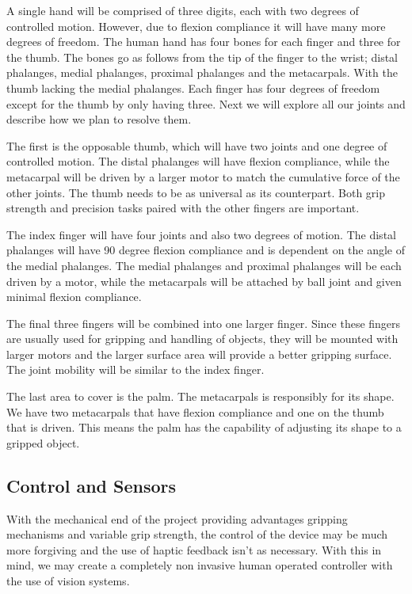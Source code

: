 \documentclass{article}
\begin{document}
A single hand will be comprised of three digits, each with two degrees of controlled motion. However, due to flexion compliance it will have many more degrees of freedom. The human hand has four bones for each finger and three for the thumb. The bones go as follows from the tip of the finger to the wrist; distal phalanges, medial phalanges, proximal phalanges and the metacarpals. With the thumb lacking the medial phalanges. Each finger has four degrees of freedom except for the thumb by only having three. Next we will explore all our joints and describe how we plan to resolve them. 

The first is the opposable thumb, which will have two joints and one degree of controlled motion. The distal phalanges will have flexion compliance, while the metacarpal will be driven by a larger motor to match the cumulative force of the other joints. The thumb needs to be as universal as its counterpart. Both grip strength and precision tasks paired with the other fingers are important. 

The index finger will have four joints and also two degrees of motion. The distal phalanges will have 90 degree flexion compliance and is dependent on the angle of the medial phalanges. The medial phalanges and proximal phalanges will be each driven by a motor, while the metacarpals will be attached by ball joint and given minimal flexion compliance.

The final three fingers will be combined into one larger finger. Since these fingers are usually used for gripping and handling of objects, they will be mounted with larger motors and the larger surface area will provide a better gripping surface. The joint mobility will be similar to the index finger.

The last area to cover is the palm. The metacarpals is responsibly for its shape. We have two metacarpals that have flexion compliance and one on the thumb that is driven. This means the palm has the capability of adjusting its shape to a gripped object.

\subsection{Control and Sensors}

With the mechanical end of the project providing advantages gripping mechanisms and variable grip strength, the control of the device may be much more forgiving and the use of haptic feedback isn't as necessary. With this in mind, we may create a completely non invasive human operated controller with the use of vision systems.
\end{document}
